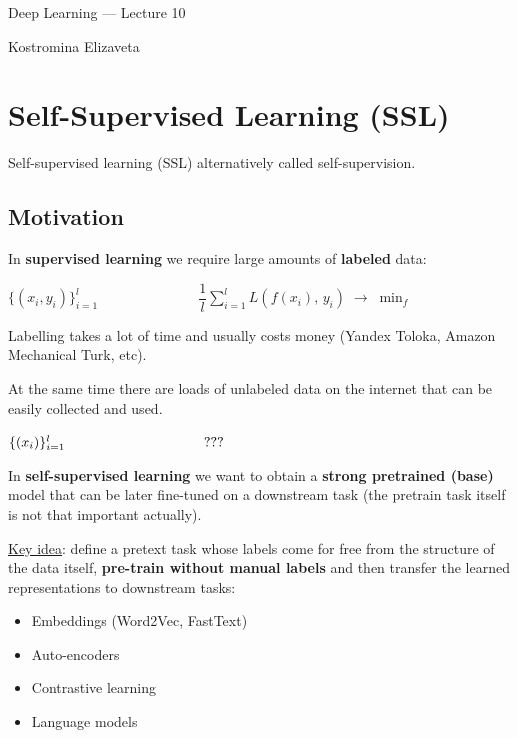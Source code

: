 \documentclass[10pt]{article}
\begin{document}
\begin{center}
    Deep Learning --- Lecture 10

        \vspace{0.5cm}

Kostromina Elizaveta
\end{center}

\tableofcontents
\newpage

\section{Self-Supervised Learning (SSL)}
Self-supervised learning (SSL) alternatively called self-supervision.


\subsection*{Motivation}
In \textbf{supervised learning} we require large amounts of \textbf{labeled} data:

$\{(x_i, y_i)\}_{i=1}^{l} \hspace{3cm} \dfrac{1}{l}\sum_{i=1}^{l} L\!\left(f(x_i),\, y_i\right) \;\rightarrow\; \min_{f}$

Labelling takes a lot of time and usually costs money (Yandex Toloka, Amazon Mechanical Turk, etc).

At the same time there are loads of unlabeled data on the internet that can be easily collected and used.

$\{(x_i)\}_{i=1}^{l} \hspace{3.5cm} ???$ 

In \textbf{self-supervised learning} we want to obtain a \textbf{strong pretrained (base)} model that can be later fine-tuned on a downstream task (the pretrain task itself is not that important actually).

\underline{Key idea}: define a pretext task whose labels come for free from the structure of the data itself, \textbf{pre-train without manual labels} and then transfer the learned representations to downstream tasks:

\begin{itemize}
    \item[-] Embeddings (Word2Vec, FastText)
    \item[-] Auto-encoders 
    \item[-] Contrastive learning
    \item[-] Language models
\end{itemize}
\end{document}
